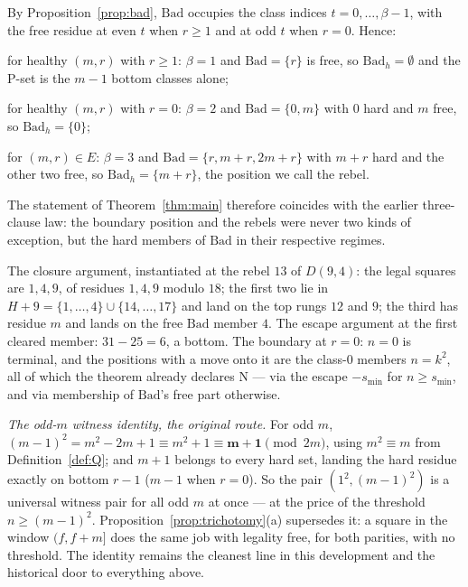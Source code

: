\begin{corollary}\label{cor:explicit}
By Proposition~\ref{prop:bad}, $\mathrm{Bad}$ occupies the class indices
$t = 0, \dots, \beta-1$, with the free residue at even $t$ when
$r \ge 1$ and at odd $t$ when $r = 0$. Hence:

for healthy $(m,r)$ with $r \ge 1$: $\beta = 1$ and
$\mathrm{Bad} = \{r\}$ is free, so $\mathrm{Bad}_h = \emptyset$ and the
P-set is the $m-1$ bottom classes alone;

for healthy $(m,r)$ with $r = 0$: $\beta = 2$ and
$\mathrm{Bad} = \{0, m\}$ with $0$ hard and $m$ free, so
$\mathrm{Bad}_h = \{0\}$;

for $(m,r) \in E$: $\beta = 3$ and
$\mathrm{Bad} = \{r, m+r, 2m+r\}$ with $m+r$ hard and the other two free,
so $\mathrm{Bad}_h = \{m + r\}$, the position we call the rebel.

The statement of Theorem~\ref{thm:main} therefore coincides with the
earlier three-clause law: the boundary position and the rebels were never
two kinds of exception, but the hard members of $\mathrm{Bad}$ in their
respective regimes.
\end{corollary}

\begin{remark}[Receipts]\label{rem:receipts}
The closure argument, instantiated at the rebel $13$ of $D(9,4)$: the
legal squares are $1, 4, 9$, of residues $1, 4, 9$ modulo $18$; the first
two lie in $H + 9 = \{1,\dots,4\} \cup \{14,\dots,17\}$ and land on the
top rungs $12$ and $9$; the third has residue $m$ and lands on the free
$\mathrm{Bad}$ member $4$. The escape argument at the first cleared
member: $31 - 25 = 6$, a bottom. The boundary at $r = 0$: $n = 0$ is
terminal, and the positions with a move onto it are the class-$0$ members
$n = k^2$, all of which the theorem already declares N --- via the escape
$-s_{\min}$ for $n \ge s_{\min}$, and via membership of $\mathrm{Bad}$'s
free part otherwise.
\end{remark}

\begin{remark}\label{rem:historical}
\emph{The odd-$m$ witness identity, the original route.} For odd $m$,
$(m - 1)^2 = m^2 - 2m + 1 \equiv m^2 + 1 \equiv \mathbf{m + 1}
\pmod{2m}$, using $m^2 \equiv m$ from Definition~\ref{def:Q}; and $m + 1$ belongs to
every hard set, landing the hard residue exactly on bottom $r - 1$
($m - 1$ when $r = 0$). So the pair $(1^2, (m - 1)^2)$ is a universal
witness pair for all odd $m$ at once --- at the price of the threshold
$n \ge (m - 1)^2$. Proposition~\ref{prop:trichotomy}(a) supersedes it: a square in the
window $(f, f+m]$ does the same job with legality free, for both parities, with no
threshold. The identity remains the cleanest line in this development and the
historical door to everything above.
\end{remark}


